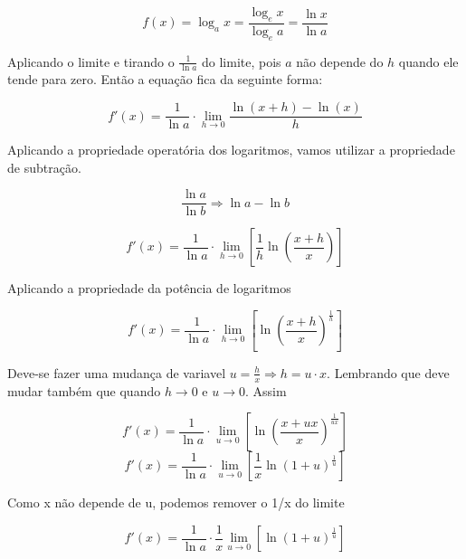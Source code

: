 \documentclass[article,12pt,oneside,a4paper,brazil]{abntex2}
\begin{document}
\begin{flushleft}
		\begin{equation*}
			f(x) = \log_{a}{x} = \frac{\log_{e}{x}}{\log_{e}{a}} = \frac{\ln{x}}{\ln{a}}
		\end{equation*}
		
		Aplicando o limite e tirando o $\frac{1}{\ln{a}}$ do limite, pois $a$ não depende do $h$ quando ele tende para zero. Então a equação fica da seguinte forma:
		
		\begin{equation*}
			f'(x) = \frac{1}{\ln{a}} \cdot \lim_{h \rightarrow 0} \frac{\ln{(x + h)} - \ln{(x)}}{h}
		\end{equation*}
		
		Aplicando a propriedade operatória dos logaritmos, vamos utilizar a propriedade de subtração.
		
		\begin{equation*}
			\frac{\ln{a}}{\ln{b}} \Rightarrow \ln{a} - \ln{b}
		\end{equation*}
		
		\begin{equation*}
			f'(x) = \frac{1}{\ln{a}} \cdot \lim_{h \rightarrow 0} \left[ \frac{1}{h} \ln \left( {\frac{x +h}{x}}\right) \right]
		\end{equation*}
		
		Aplicando a propriedade da potência de logaritmos
		
		\begin{equation*}
			f'(x) = \frac{1}{\ln{a}} \cdot \lim_{h \rightarrow 0} \left[ \ln \left( {\frac{x +h}{x}}\right)^{\frac{1}{h}} \right]
		\end{equation*}
		
		Deve-se fazer uma mudança de variavel $u=\frac{h}{x} \Rightarrow h =u \cdot x$. Lembrando que deve mudar também que quando $h \rightarrow 0$ e $u \rightarrow 0$. Assim
		
		\begin{equation*}
			f'(x) = \frac{1}{\ln{a}} \cdot \lim_{u \rightarrow 0} \left[ \ln \left( {\frac{x + ux}{x}}\right)^{\frac{1}{ux}} \right]
		\end{equation*}
		\begin{equation*}
			f'(x) = \frac{1}{\ln{a}} \cdot \lim_{u \rightarrow 0} \left[ \frac{1}{x} \ln \left( {1 + u}\right)^{\frac{1}{u}} \right]
		\end{equation*}
				
		Como x não depende de u, podemos remover o 1/x do limite
		
		\begin{equation*}
			f'(x) = \frac{1}{\ln{a}} \cdot \frac{1}{x} \lim_{u \rightarrow 0} \left[ \ln \left( {1 + u}\right)^{\frac{1}{u}} \right]
		\end{equation*}
				

\end{flushleft}
\end{document}
